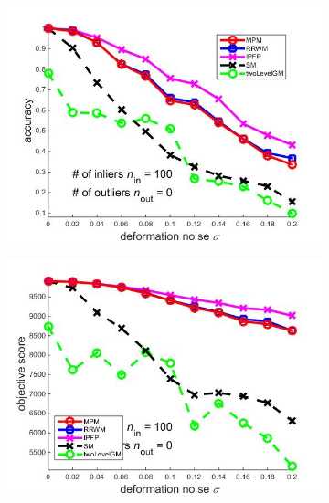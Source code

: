 \documentclass[
	fontsize=12pt,
	paper=a4,
	twoside=false,
	numbers=noenddot,
	plainheadsepline,
	toc=listof,
	toc=bibliography
]{scrartcl}
\begin{document}
\begin{figure}[h] 
	\begin{subfigure}[b]{0.3\textwidth}
		\centering
		\includegraphics[scale=0.25]{"fig_ver2108/syntheticPointSets/deformation_test/accuracy_avg10tests"} 
	\end{subfigure}%
	\begin{subfigure}[b]{0.3\textwidth}
		\centering
		\includegraphics[scale=0.25]{"fig_ver2108/syntheticPointSets/deformation_test/score_avg10tests"} 
	\end{subfigure} 
	\begin{subfigure}[b]{0.3\textwidth}
		\centering

\end{subfigure}
\end{figure}
\end{document}
